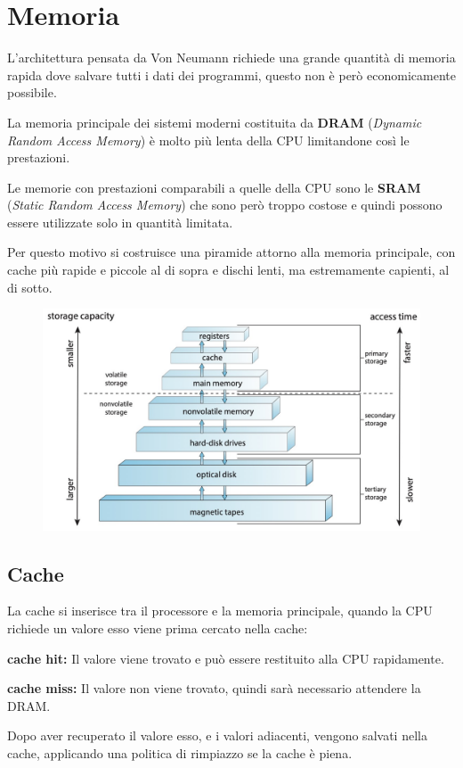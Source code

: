 \section{Memoria}

L'architettura pensata da Von Neumann richiede una grande quantità di memoria rapida dove salvare tutti i dati dei programmi, questo non è però economicamente possibile.

\spacer
La memoria principale dei sistemi moderni costituita da \textbf{DRAM} (\textit{Dynamic Random Access Memory}) è molto più lenta della CPU limitandone così le prestazioni.

Le memorie con prestazioni comparabili a quelle della CPU sono le \textbf{SRAM} (\textit{Static Random Access Memory}) che sono però troppo costose e quindi possono essere utilizzate solo in quantità limitata.

\spacer
Per questo motivo si costruisce una piramide attorno alla memoria principale, con cache più rapide e piccole al di sopra e dischi lenti, ma estremamente capienti, al di sotto.

\begin{figure}[H]
    \centering
    \includegraphics[width=0.48\linewidth]{assets/storage-hierarchy.jpg}
\end{figure}

\subsection{Cache}

La cache si inserisce tra il processore e la memoria principale, quando la CPU richiede un valore esso viene prima cercato nella cache:
\spacer
\begin{sitemize}
    \item \textbf{cache hit:} Il valore viene trovato e può essere restituito alla CPU rapidamente.
    \item \textbf{cache miss:} Il valore non viene trovato, quindi sarà necessario attendere la DRAM.

    Dopo aver recuperato il valore esso, e i valori adiacenti, vengono salvati nella cache, applicando una politica di rimpiazzo se la cache è piena.
\end{sitemize}

